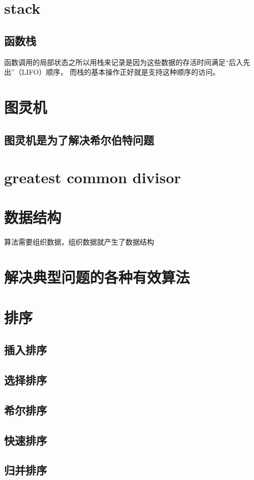 \documentclass[UTF8]{ctexart}
\begin{document}
\section{stack}
\subsection{函数栈}
函数调用的局部状态之所以用栈来记录是因为这些数据的存活时间满足“后入先出”（LIFO）顺序，
而栈的基本操作正好就是支持这种顺序的访问。

\section{图灵机}
\subsection{图灵机是为了解决希尔伯特问题}

\section{greatest common divisor}

\section{数据结构}
算法需要组织数据，组织数据就产生了数据结构

\section{解决典型问题的各种有效算法}

\section{排序}
\subsection{插入排序}
\subsection{选择排序}
\subsection{希尔排序}
\subsection{快速排序}
\subsection{归并排序}
\end{document}
